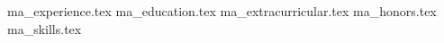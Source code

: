\documentclass[11pt, a4paper, table]{awesome-cv}
\begin{document}
\makecvheader

{ma_experience.tex}
{ma_education.tex}
{ma_extracurricular.tex}
{ma_honors.tex}
{ma_skills.tex}

\end{document}
